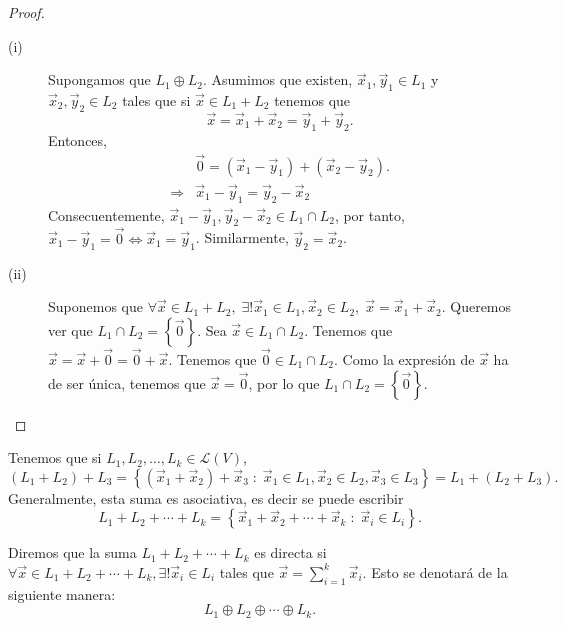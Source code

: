 \begin{proof}
\begin{description}
\item[(i)] Supongamos que $\displaystyle L_{1} \oplus L_{2} $. Asumimos que existen, $\displaystyle \vec{x}_{1}, \vec{y}_{1} \in L_{1} $ y $\displaystyle \vec{x}_{2}, \vec{y}_{2} \in L_{2} $ tales que si $\displaystyle \vec{x} \in L_{1} + L_{2} $ tenemos que 
	\[\vec{x} = \vec{x}_{1} + \vec{x}_{2} = \vec{y}_{1} + \vec{y}_{2} .\]
Entonces, 
\[
\begin{split}
& \vec{0} = \left(\vec{x}_{1} - \vec{y}_{1}\right) + \left(\vec{x}_{2} - \vec{y}_{2}\right) .\\ 
\Rightarrow & \vec{x}_{1} - \vec{y}_{1} = \vec{y}_{2} - \vec{x}_{2}
\end{split}
\]
Consecuentemente, $\displaystyle \vec{x}_{1} - \vec{y}_{1}, \vec{y}_{2} - \vec{x}_{2} \in L_{1} \cap L_{2} $, por tanto, $\displaystyle \vec{x}_{1}-\vec{y}_{1} = \vec{0} \iff \vec{x}_{1} = \vec{y}_{1} $. Similarmente, $\displaystyle \vec{y}_{2} = \vec{x}_{2} $.
\item[(ii)] Suponemos que $\displaystyle \forall \vec{x}\in L_{1} + L_{2}, \; \exists!\vec{x}_{1} \in L_{1}, \vec{x}_{2} \in L_{2}, \; \vec{x} = \vec{x}_{1} + \vec{x}_{2} $. Queremos ver que $\displaystyle L_{1}\cap L_{2} = \left\{ \vec{0}\right\}  $. Sea $\displaystyle \vec{x} \in L_{1} \cap L_{2} $. Tenemos que $\displaystyle \vec{x} = \vec{x} + \vec{0} = \vec{0} + \vec{x} $. Tenemos que $\displaystyle \vec{0} \in L_{1} \cap L_{2} $. Como la expresión de $\displaystyle \vec{x} $ ha de ser única, tenemos que $\displaystyle \vec{x} = \vec{0} $, por lo que $\displaystyle L_{1}\cap L_{2} = \left\{ \vec{0}\right\}  $.
\end{description}
\end{proof}

Tenemos que si $\displaystyle L_{1}, L_{2}, \ldots, L_{k} \in \mathcal{L}\left(V\right) $, 
\[\left(L_{1} + L_{2}\right) + L_{3} = \left\{ \left(\vec{x}_{1} + \vec{x}_{2}\right) + \vec{x}_{3}\; : \; \vec{x}_{1} \in L_{1}, \vec{x}_{2} \in L_{2}, \vec{x}_{3} \in L_{3}\right\} = L_{1}+\left(L_{2} + L_{3}\right) .\]
Generalmente, esta suma es asociativa, es decir se puede escribir
\[L_{1} + L_{2} + \cdots + L_{k} = \left\{ \vec{x}_{1} + \vec{x}_{2} + \cdots + \vec{x}_{k} \; : \; \vec{x}_{i} \in L_{i}\right\}  .\]

\begin{fdefinition}[]
\normalfont Diremos que la suma $\displaystyle L_{1} + L_{2} + \cdots + L_{k}$ es directa si $\displaystyle \forall \vec{x} \in L_{1} + L_{2} + \cdots + L_{k}, \exists! \vec{x}_{i} \in L_{i} $ tales que $\displaystyle \vec{x} = \sum^{k}_{i=1}\vec{x}_{i} $. Esto se denotará de la siguiente manera:
\[L_{1} \oplus L_{2} \oplus \cdots \oplus L_{k}.\]
\end{fdefinition}

